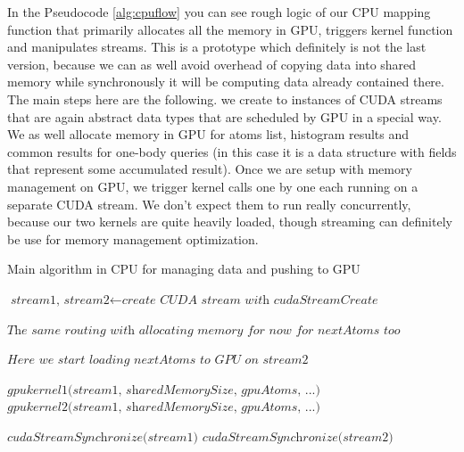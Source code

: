 \documentclass[12pt,letterpaper]{report}
\begin{document}
In the Pseudocode \ref{alg:cpuflow} you can see rough logic of our CPU mapping function that primarily allocates all the memory in GPU, triggers kernel function and manipulates streams. This is a prototype which definitely is not the last version, because we can as well avoid overhead of copying data into shared memory while synchronously it will be computing data already contained there. The main steps here are the following. we create to instances of CUDA streams that are again abstract data types that are scheduled by GPU in a special way. We as well allocate memory in GPU for atoms list, histogram results and common results for one-body queries (in this case it is a data structure with fields that represent some accumulated result). Once we are setup with memory management on GPU, we trigger kernel calls one by one each running on a separate CUDA stream. We don't expect them to run really concurrently, because our two kernels are quite heavily loaded, though streaming can definitely be use for memory management optimization.


\vspace{1cm}
\begin{algorithm}
\caption{Main algorithm in CPU for managing data and pushing to GPU}
\label{alg:cpuflowfuture}
\begin{algorithmic}[1]

\State $\textit{stream1, stream2} \gets \textit{create CUDA stream with cudaStreamCreate}$

\State
\State $\textit{The same routing with allocating memory for now for nextAtoms too}$

\State
\State $\textit{Here we start loading nextAtoms to GPU on stream2 }$
\State


\State $\textit{gpukernel1(stream1, sharedMemorySize, gpuAtoms, ...)}$
\State $\textit{gpukernel2(stream1, sharedMemorySize, gpuAtoms, ...)}$

\State
\State $\textit{cudaStreamSynchronize(stream1)}$
\State $\textit{cudaStreamSynchronize(stream2)}$

\EndFor

\EndProcedure
\end{algorithmic}
\end{algorithm}
\end{document}
